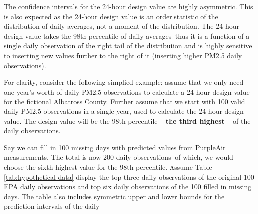 \documentclass[12pt]{article}
\begin{document}
The confidence intervals for the 24-hour design value are highly asymmetric. This is also expected as the 24-hour design value is an order statistic of the distribution of daily averages, not a moment of the distribution. The 24-hour design value takes the 98th percentile of daily averages, thus it is a function of a single daily observation of the right tail of the distribution and is highly sensitive to inserting new values further to the right of it (inserting higher PM2.5 daily observations).

For clarity, consider the following simplied example: assume that we only need one year's worth of daily PM2.5 observations to calculate a 24-hour design value for the fictional Albatross County. Further assume that we start with 100 valid daily PM2.5 observations in a single year, used to calculate the 24-hour design value. The design value will be the 98th percentile -- \textbf{the third highest} -- of the daily observations. 

Say we can fill in 100 missing days with predicted values from PurpleAir measurements. The total is now 200 daily observations, of which, we would choose the sixth highest value for the 98th percentile. Assume Table \ref{tab:hypothetical-data} display the top three daily observations of the original 100 EPA daily observations and top six daily observations of the 100 filled in missing days. The table also includes symmetric upper and lower bounds for the prediction intervals of the daily 

\begin{table}[h!]
\caption{Hypothetical PM2.5 daily averages from EPA reported measurements and PurpleAir-imputed daily averages that were missing from the EPA data. Column 1: top three original EPA PM2.5 measurements. Columns 2-4: The six added daily averages that were greater than the EPA top 3 daily averages, where added daily averages were filled-in from PurpleAir.}
\label{tab:hypothetical-data}
\end{table}
\end{document}
